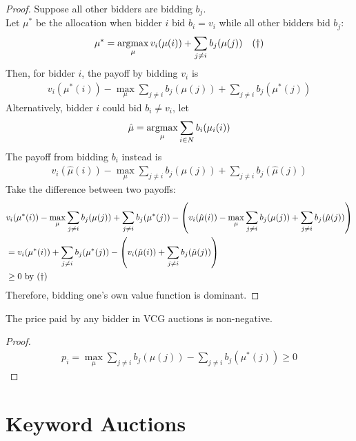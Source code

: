 \documentclass{article}
\begin{document}
	\begin{proof}
		Suppose all other bidders are bidding $b_j$. \\
		Let $\mu^*$ be the allocation when bidder $i$ bid $b_i = v_i$ while all other bidders bid $b_j$:
		\begin{align}
			\mu^* = \operatorname*{argmax}_\mu v_i(\mu(i)) + \sum_{j\neq i} b_j(\mu(j))\quad (\dagger)
		\end{align}
		Then, for bidder $i$, the payoff by bidding $v_i$ is
		\begin{align}
			v_i(\mu^*(i)) - \max_\mu \sum_{j \neq i} b_j(\mu(j)) + \sum_{j \neq i}b_j(\mu^*(j))
		\end{align}
		Alternatively, bidder $i$ could bid $b_i \neq v_i$, let
		\begin{align}
			\hat{\mu} = \operatorname*{argmax}_\mu \sum_{i \in N} b_i(\mu_i(i))
		\end{align}
		The payoff from bidding $b_i$ instead is
		\begin{align}
			v_i(\hat{\mu}(i)) -  \max_\mu \sum_{j \neq i} b_j(\mu(j)) + \sum_{j \neq i}b_j(\hat{\mu}(j))
		\end{align}
		Take the difference between two payoffs:
		\begin{align}
			&v_i(\mu^*(i)) - \max_\mu \sum_{j \neq i} b_j(\mu(j)) + \sum_{j \neq i}b_j(\mu^*(j))
			- \left(
			v_i(\hat{\mu}(i)) -  \max_\mu \sum_{j \neq i} b_j(\mu(j)) + \sum_{j \neq i}b_j(\hat{\mu}(j))
			\right) \\
			&= v_i(\mu^*(i)) + \sum_{j \neq i}b_j(\mu^*(j)) - \left(v_i(\hat{\mu}(i)) + \sum_{j \neq i}b_j(\hat{\mu}(j))
			\right) \\
			&\geq 0 \text{{ by }} (\dagger)
		\end{align}
		Therefore, bidding one's own value function is dominant.
	\end{proof}
	
	\begin{proposition}
		The price paid by any bidder in VCG auctions is non-negative.
	\end{proposition}
	
	\begin{proof}
		\begin{align}
			p_i = \max_\mu \sum_{j \neq i} b_j(\mu(j)) - \sum_{j \neq i}b_j(\mu^*(j)) \geq 0
		\end{align}
	\end{proof}
	
	\section{Keyword Auctions}
	
\end{document}
